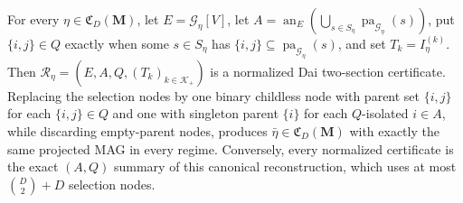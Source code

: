 For every \(\eta\in\mathfrak C_D(\mathbf M)\), let \(E=\mathcal G_\eta[V]\), let \(A=\operatorname{an}_E(\bigcup_{s\in S_\eta}\operatorname{pa}_{\mathcal G_\eta}(s))\), put \(\{i,j\}\in Q\) exactly when some \(s\in S_\eta\) has \(\{i,j\}\subseteq\operatorname{pa}_{\mathcal G_\eta}(s)\), and set \(T_k=I_\eta^{(k)}\).  Then \(\mathcal R_\eta=(E,A,Q,(T_k)_{k\in\mathcal K_+})\) is a normalized Dai two-section certificate.  Replacing the selection nodes by one binary childless node with parent set \(\{i,j\}\) for each \(\{i,j\}\in Q\) and one with singleton parent \(\{i\}\) for each \(Q\)-isolated \(i\in A\), while discarding empty-parent nodes, produces \(\bar\eta\in\mathfrak C_D(\mathbf M)\) with exactly the same projected MAG in every regime.  Conversely, every normalized certificate is the exact \((A,Q)\) summary of this canonical reconstruction, which uses at most \(\binom D2+D\) selection nodes.